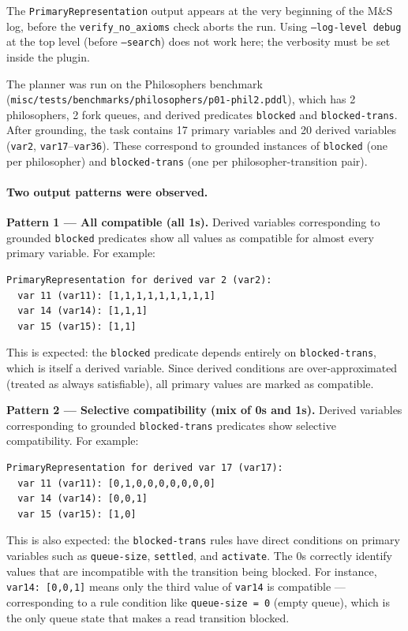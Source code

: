 \documentclass[11pt,a4paper]{article}
\begin{document}
The \texttt{PrimaryRepresentation} output appears at the very beginning of
the M\&S log, before the \texttt{verify\_no\_axioms} check aborts the run.
Using \texttt{--log-level debug} at the top level (before \texttt{--search})
does not work here; the verbosity must be set inside the plugin.

The planner was run on the Philosophers benchmark
(\texttt{misc/tests/benchmarks/philosophers/p01-phil2.pddl}), which has
2 philosophers, 2 fork queues, and derived predicates \texttt{blocked} and
\texttt{blocked-trans}.  After grounding, the task contains 17 primary
variables and 20 derived variables (\texttt{var2}, \texttt{var17}--\texttt{var36}).
These correspond to grounded instances of \texttt{blocked} (one per
philosopher) and \texttt{blocked-trans} (one per philosopher-transition pair).

\paragraph{Two output patterns were observed.}

\textbf{Pattern 1 — All compatible (all 1s).}
Derived variables corresponding to grounded \texttt{blocked} predicates show
all values as compatible for almost every primary variable.  For example:
\begin{lstlisting}
PrimaryRepresentation for derived var 2 (var2):
  var 11 (var11): [1,1,1,1,1,1,1,1,1]
  var 14 (var14): [1,1,1]
  var 15 (var15): [1,1]
\end{lstlisting}
This is expected: the \texttt{blocked} predicate depends entirely on
\texttt{blocked-trans}, which is itself a derived variable.  Since derived
conditions are over-approximated (treated as always satisfiable), all primary
values are marked as compatible.

\textbf{Pattern 2 — Selective compatibility (mix of 0s and 1s).}
Derived variables corresponding to grounded \texttt{blocked-trans} predicates
show selective compatibility.  For example:
\begin{lstlisting}
PrimaryRepresentation for derived var 17 (var17):
  var 11 (var11): [0,1,0,0,0,0,0,0,0]
  var 14 (var14): [0,0,1]
  var 15 (var15): [1,0]
\end{lstlisting}
This is also expected: the \texttt{blocked-trans} rules have direct conditions
on primary variables such as \texttt{queue-size}, \texttt{settled}, and
\texttt{activate}.  The 0s correctly identify values that are incompatible
with the transition being blocked.  For instance, \texttt{var14: [0,0,1]}
means only the third value of \texttt{var14} is compatible --- corresponding
to a rule condition like \texttt{queue-size = 0} (empty queue), which is the
only queue state that makes a read transition blocked.
\end{document}
